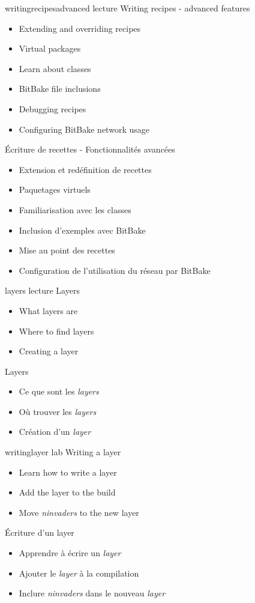 {writingrecipesadvanced}
{lecture}
{Writing recipes - advanced features}
{
  \begin{itemize}
  \item Extending and overriding recipes
  \item Virtual packages
  \item Learn about classes
  \item BitBake file inclusions
  \item Debugging recipes
  \item Configuring BitBake network usage
  \end{itemize}
}
{Écriture de recettes - Fonctionnalités avancées}
{
  \begin{itemize}
  \item Extension et redéfinition de recettes
  \item Paquetages virtuels
  \item Familiarisation avec les classes
  \item Inclusion d'exemples avec BitBake
  \item Mise au point des recettes
  \item Configuration de l'utilisation du réseau par BitBake
  \end{itemize}
}

{layers}
{lecture}
{Layers}
{
  \begin{itemize}
  \item What layers are
  \item Where to find layers
  \item Creating a layer
  \end{itemize}
}
{Layers}
{
  \begin{itemize}
  \item Ce que sont les {\em layers}
  \item Où trouver les {\em layers}
  \item Création d'un {\em layer}
  \end{itemize}
}

{writinglayer}
{lab}
{Writing a layer}
{
  \begin{itemize}
  \item Learn how to write a layer
  \item Add the layer to the build
  \item Move {\em ninvaders} to the new layer
  \end{itemize}
}
{Écriture d'un layer}
{
  \begin{itemize}
  \item Apprendre à écrire un {\em layer}
  \item Ajouter le {\em layer} à la compilation
  \item Inclure {\em ninvaders} dans le nouveau {\em layer}
  \end{itemize}
}

